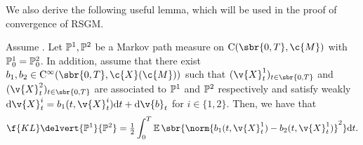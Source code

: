 We also derive the following useful lemma, which will be used in the proof of convergence of RSGM.

\begin{corollary}
	\label{col:KL_diff}
	Assume .
	Let \(\bb{P}^1, \bb{P}^2\) be a Markov path measure on \(\mathrm{C}(\sbr{0,T}, \c{M})\) with \(\bb{P}_0^1 = \bb{P}_0^2\).
	In addition, assume that there exist \(b_1,b_2 \in \mathrm{C}^\infty(\sbr{0,T}, \c{X}(\c{M}))\) such that \((\v{X}_t^1)_{t \in \sbr{0,T}}\) and \((\v{X}_t^2)_{t \in \sbr{0,T}}\) are associated to \(\bb{P}^1\) and \(\bb{P}^2\) respectively and satisfy weakly \(\mathrm{d} \v{X}_t^i = b_1(t,\v{X}_t^i) \mathrm{d} t + \mathrm{d} \v{b}_t\) for \(i \in \{1,2\}\).
	Then, we have that \begin{equation} {\f{KL}\delvert{\bb{P}^1}{\bb{P}^2} = \tfrac{1}{2} \int_0^T \E\sbr{\norm{b_1(t,\v{X}_t^1) - b_2(t,\v{X}_t^1)}^2} \mathrm{d} t .
		}
	\end{equation}
\end{corollary}


